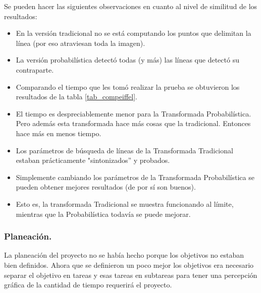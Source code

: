 Se pueden hacer las siguientes observaciones en cuanto al nivel de similitud de los resultados:

\begin{itemize}
	\item En la versión tradicional no se está computando los puntos que delimitan la línea (por eso atraviesan toda la imagen).
	\item La versión probabilística detectó todas (y más) las líneas que detectó su contraparte.
	\item Comparando el tiempo que les tomó realizar la prueba se obtuvieron los resultados de la tabla \ref{tab_compeiffel}.
	\item El tiempo es despreciablemente menor para la Transformada Probabilística. Pero además esta transformada hace más cosas que la tradicional. Entonces hace más en menos tiempo.
	\item Los parámetros de búsqueda de líneas de la Transformada Tradicional estaban prácticamente "sintonizados'' y probados.
	\item Simplemente cambiando los parámetros de la Transformada Probabilística se pueden obtener mejores resultados (de por sí son buenos).
	\item Esto es, la transformada Tradicional se muestra funcionando al límite, mientras que la Probabilística todavía se puede mejorar.
\end{itemize}






\subsubsection{Planeación.}
La planeación del proyecto no se había hecho porque los objetivos no estaban bien definidos. Ahora que se definieron un poco mejor los objetivos era necesario separar el objetivo en tareas y esas tareas en subtareas para tener una percepción gráfica de la cantidad de tiempo requerirá el proyecto.

